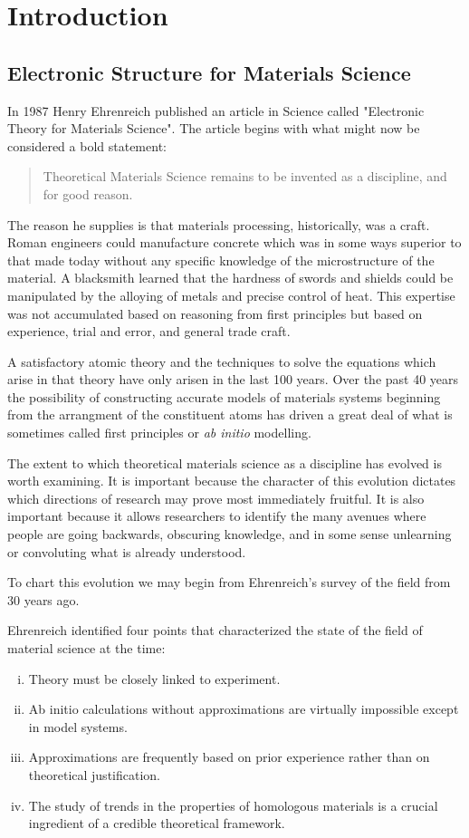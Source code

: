 \chapter{Introduction}
\section{Electronic Structure for Materials Science}
In 1987 Henry Ehrenreich published an article in Science called
"Electronic Theory for Materials Science". The article begins
with what might now be considered a bold statement:

\begin{quote}
Theoretical Materials Science remains to be invented as a discipline, and for good reason.
\end{quote}

The reason he supplies is that materials processing, historically, was a craft. 
Roman engineers could manufacture concrete which was in some ways superior to that
made today without any specific knowledge of the microstructure of the material.
A blacksmith learned that the hardness of swords and shields could be manipulated 
by the alloying of metals and precise control of heat. This expertise was not accumulated 
based on reasoning from first principles but based on experience, trial and error, 
and general trade craft.

A satisfactory atomic theory and the techniques to solve the equations which arise in that theory
have only arisen in the last 100 years. Over the past 40 years the possibility of constructing
accurate models of materials systems beginning from the arrangment of the constituent atoms has
driven a great deal of what is sometimes called first principles or {\it ab initio} modelling.

The extent to which theoretical materials science as a discipline has evolved is worth examining. 
It is important because the character of this evolution dictates which directions of research may prove most
immediately fruitful. It is also important because it allows researchers to identify the many avenues
where people are going backwards, obscuring knowledge, and in some sense unlearning or convoluting 
what is already understood. 

To chart this evolution we may begin from Ehrenreich's survey of the field from 30 years ago.

Ehrenreich identified four points that characterized the state of the field of material science at the time:
%
\begin{enumerate}[i)]
\item Theory must be closely linked to experiment.
\item Ab initio calculations without approximations are virtually impossible except in model systems.
\item Approximations are frequently based on prior experience rather than on theoretical justification.
\item The study of trends in the properties of homologous materials 
      is a crucial ingredient of a credible theoretical framework.
\end{enumerate}
%

